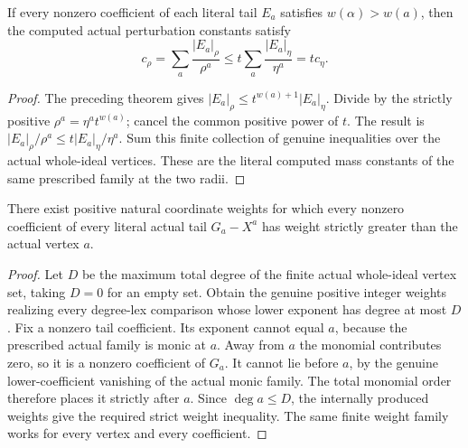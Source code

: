 \begin{theorem}
\label{hir:actual-vertex-tail-ratio-shrink}
\leanok
If every nonzero coefficient of each literal tail $E_a$ satisfies $w(\alpha)>w(a)$, then the computed actual perturbation constants satisfy
\[
 c_\rho=\sum_a\frac{|E_a|_\rho}{\rho^a}
 \le t\sum_a\frac{|E_a|_\eta}{\eta^a}=t c_\eta.
\]
\end{theorem}
\begin{proof}
The preceding theorem gives $|E_a|_\rho\le t^{w(a)+1}|E_a|_\eta$. Divide by the strictly positive $\rho^a=\eta^a t^{w(a)}$; cancel the common positive power of $t$. The result is $|E_a|_\rho/\rho^a\le t|E_a|_\eta/\eta^a$. Sum this finite collection of genuine inequalities over the actual whole-ideal vertices. These are the literal computed mass constants of the same prescribed family at the two radii.
\end{proof}

\begin{theorem}
\label{hir:actual-deg-lex-vertex-tail-weight}
\leanok
There exist positive natural coordinate weights for which every nonzero coefficient of every literal actual tail $G_a-X^a$ has weight strictly greater than the actual vertex $a$.
\end{theorem}
\begin{proof}
Let $D$ be the maximum total degree of the finite actual whole-ideal vertex set, taking $D=0$ for an empty set. Obtain the genuine positive integer weights realizing every degree-lex comparison whose lower exponent has degree at most $D$. Fix a nonzero tail coefficient. Its exponent cannot equal $a$, because the prescribed actual family is monic at $a$. Away from $a$ the monomial contributes zero, so it is a nonzero coefficient of $G_a$. It cannot lie before $a$, by the genuine lower-coefficient vanishing of the actual monic family. The total monomial order therefore places it strictly after $a$. Since $\deg a\le D$, the internally produced weights give the required strict weight inequality. The same finite weight family works for every vertex and every coefficient.
\end{proof}

